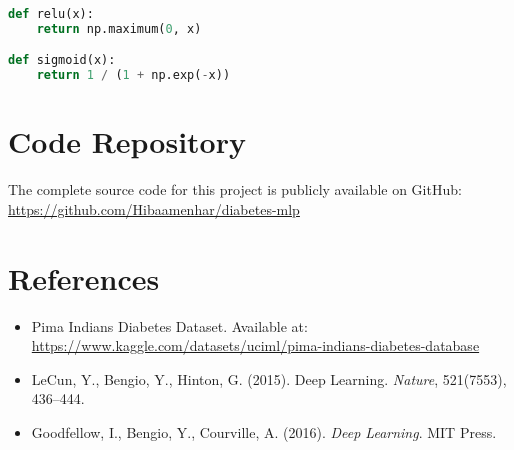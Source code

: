 \documentclass[12pt]{article}
\begin{document}
\begin{lstlisting}[language=Python, caption=Activation Functions]
def relu(x):
    return np.maximum(0, x)

def sigmoid(x):
    return 1 / (1 + np.exp(-x))
\end{lstlisting}


\section*{Code Repository}
The complete source code for this project is publicly available on GitHub: \\
\url{https://github.com/Hibaamenhar/diabetes-mlp}

\section*{References}
\begin{itemize}
    \item Pima Indians Diabetes Dataset. Available at: \url{https://www.kaggle.com/datasets/uciml/pima-indians-diabetes-database}
    \item LeCun, Y., Bengio, Y., Hinton, G. (2015). Deep Learning. \textit{Nature}, 521(7553), 436–444.
    \item Goodfellow, I., Bengio, Y., Courville, A. (2016). \textit{Deep Learning}. MIT Press.
\end{itemize}
\end{document}
